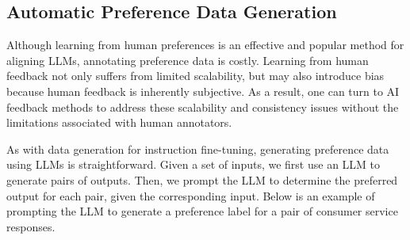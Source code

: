 \subsection{Automatic Preference Data Generation}

\noindent Although learning from human preferences is an effective and popular method for aligning LLMs, annotating preference data is costly. Learning from human feedback not only suffers from limited scalability, but may also introduce bias because human feedback is inherently subjective. As a result, one can turn to AI feedback methods to address these scalability and consistency issues without the limitations associated with human annotators.

As with data generation for instruction fine-tuning, generating preference data using LLMs is straightforward. Given a set of inputs, we first use an LLM to generate pairs of outputs. Then, we prompt the LLM to determine the preferred output for each pair, given the corresponding input. Below is an example of prompting the LLM to generate a preference label for a pair of consumer service responses.

